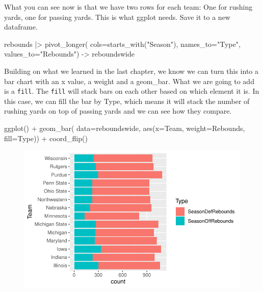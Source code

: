 \documentclass[
  letterpaper,
  DIV=11,
  numbers=noendperiod]{scrreprt}
\newenvironment{Shaded}{\begin{snugshade}}{\end{snugshade}}
\newcommand{\AttributeTok}[1]{\textcolor[rgb]{0.40,0.45,0.13}{#1}}
\newcommand{\FunctionTok}[1]{\textcolor[rgb]{0.28,0.35,0.67}{#1}}
\newcommand{\NormalTok}[1]{\textcolor[rgb]{0.00,0.23,0.31}{#1}}
\newcommand{\OtherTok}[1]{\textcolor[rgb]{0.00,0.23,0.31}{#1}}
\newcommand{\SpecialCharTok}[1]{\textcolor[rgb]{0.37,0.37,0.37}{#1}}
\newcommand{\StringTok}[1]{\textcolor[rgb]{0.13,0.47,0.30}{#1}}
\begin{document}
What you can see now is that we have two rows for each team: One for
rushing yards, one for passing yards. This is what ggplot needs. Save it
to a new dataframe.

\begin{Shaded}
\begin{Highlighting}[]
\NormalTok{rebounds }\SpecialCharTok{|\textgreater{}} 
  \FunctionTok{pivot\_longer}\NormalTok{(}
    \AttributeTok{cols=}\FunctionTok{starts\_with}\NormalTok{(}\StringTok{"Season"}\NormalTok{), }
    \AttributeTok{names\_to=}\StringTok{"Type"}\NormalTok{, }
    \AttributeTok{values\_to=}\StringTok{"Rebounds"}\NormalTok{) }\OtherTok{{-}\textgreater{}}\NormalTok{ reboundswide}
\end{Highlighting}
\end{Shaded}

Building on what we learned in the last chapter, we know we can turn
this into a bar chart with an x value, a weight and a geom\_bar. What we
are going to add is a \texttt{fill}. The \texttt{fill} will stack bars
on each other based on which element it is. In this case, we can fill
the bar by Type, which means it will stack the number of rushing yards
on top of passing yards and we can see how they compare.

\begin{Shaded}
\begin{Highlighting}[]
\FunctionTok{ggplot}\NormalTok{() }\SpecialCharTok{+} 
  \FunctionTok{geom\_bar}\NormalTok{(}
    \AttributeTok{data=}\NormalTok{reboundswide, }
    \FunctionTok{aes}\NormalTok{(}\AttributeTok{x=}\NormalTok{Team, }\AttributeTok{weight=}\NormalTok{Rebounds, }\AttributeTok{fill=}\NormalTok{Type)) }\SpecialCharTok{+} 
  \FunctionTok{coord\_flip}\NormalTok{()}
\end{Highlighting}
\end{Shaded}

\begin{figure}[H]

{\centering \includegraphics{./stackedbars_files/figure-pdf/unnamed-chunk-8-1.pdf}

}

\end{figure}
\end{document}
